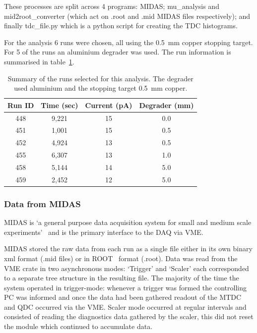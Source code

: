 These processes are split across 4 programs: MIDAS; mu\_analysis and mid2root\_converter (which act on .root and .mid MIDAS files respectively); and finally tdc\_file.py which is a python script for creating the TDC histograms.

For the analysis 6 runs were chosen, all using the 0.5~mm copper stopping target. For 5 of the runs an aluminium degrader was used. The run information is summarised in table~\ref{tab:run_summary}.
\begin{table}
	\begin{center}
	\begin{tabular}{c|c|c|c}
		Run ID & Time (sec) & Current (pA) & Degrader (mm) \\
		\hline
		448    & 9,221      & 15           & 0.0   \\
		451    & 1,001      & 15           & 0.5   \\
		452    & 4,924      & 13           & 0.5   \\
		455    & 6,307      & 13           & 1.0   \\
		458    & 5,144      & 14           & 5.0   \\
		459    & 2,452      & 12           & 5.0   \\
	\end{tabular}
	\end{center}
	\caption{Summary of the runs selected for this analysis. The degrader used aluminium and the stopping target 0.5~mm copper.}
	\label{tab:run_summary}
\end{table} 
\subsubsection{Data from MIDAS} %
\label{sub:data_from_midas}
MIDAS is `a general purpose data acquisition system for small and medium scale experiments'~\cite{ritt2012midas} and is the primary interface to the DAQ via VME. 

MIDAS stored the raw data from each run as a single file either in its own binary xml format (.mid files) or in ROOT~\cite{Brun199781} format (.root). Data was read from the VME crate in two asynchronous modes: `Trigger' and `Scaler' each corresponded to a separate tree structure in the resulting file. The majority of the time the system operated in trigger-mode: whenever a trigger was formed the controlling PC was informed and once the data had been gathered readout of the MTDC and QDC occurred via the VME. Scaler mode occurred at regular intervals and consisted of reading the diagnostics data gathered by the scaler, this did not reset the module which continued to accumulate data. 

